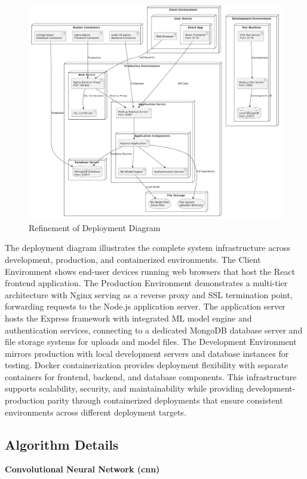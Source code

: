 \begin{enumerate}[label=\roman*.]
\begin{center}
\begin{figure}[H]
                  \includegraphics[width=1\linewidth]{Images/Refined/deployment.pdf}
                  \caption{Refinement of Deployment Diagram}
                  \label{fig:RefinementofDeploymentDiagram}
              \end{figure}
          \end{center}
          The deployment diagram illustrates the complete system infrastructure across development, production, and containerized environments. The Client Environment shows end-user devices running web browsers that host the React frontend application. The Production Environment demonstrates a multi-tier architecture with Nginx serving as a reverse proxy and SSL termination point, forwarding requests to the Node.js application server. The application server hosts the Express framework with integrated ML model engine and authentication services, connecting to a dedicated MongoDB database server and file storage systems for uploads and model files. The Development Environment mirrors production with local development servers and database instances for testing. Docker containerization provides deployment flexibility with separate containers for frontend, backend, and database components. This infrastructure supports scalability, security, and maintainability while providing development-production parity through containerized deployments that ensure consistent environments across different deployment targets.
\end{enumerate}

\subsection{Algorithm Details}
\textbf{Convolutional Neural Network (\gls{cnn})}

